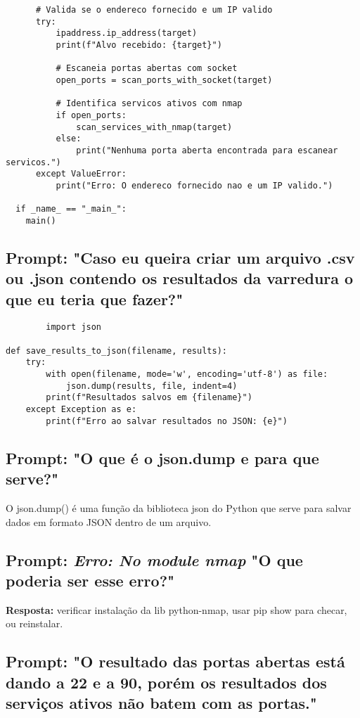 \documentclass[12pt]{article}
\begin{document}
\begin{lstlisting}
      # Valida se o endereco fornecido e um IP valido
      try:
          ipaddress.ip_address(target)
          print(f"Alvo recebido: {target}")

          # Escaneia portas abertas com socket
          open_ports = scan_ports_with_socket(target)

          # Identifica servicos ativos com nmap
          if open_ports:
              scan_services_with_nmap(target)
          else:
              print("Nenhuma porta aberta encontrada para escanear servicos.")
      except ValueError:
          print("Erro: O endereco fornecido nao e um IP valido.")

  if _name_ == "_main_":
    main()
    \end{lstlisting}

\subsection{\textbf{Prompt:} "Caso eu queira criar um arquivo .csv ou .json contendo os resultados da varredura o que eu teria que fazer?"}
    \begin{lstlisting}
        import json

def save_results_to_json(filename, results):
    try:
        with open(filename, mode='w', encoding='utf-8') as file:
            json.dump(results, file, indent=4)
        print(f"Resultados salvos em {filename}")
    except Exception as e:
        print(f"Erro ao salvar resultados no JSON: {e}")

    \end{lstlisting}
\subsection{\textbf{Prompt:} "O que é o json.dump e para que serve?"}
    O json.dump() é uma função da biblioteca json do Python que serve para salvar dados em formato JSON dentro de um arquivo.

\subsection{\textbf{Prompt:} \textit{Erro: No module nmap} "O que poderia ser esse erro?"}

\textbf{Resposta:} verificar instalação da lib python-nmap, usar pip show para checar, ou reinstalar.

\subsection{\textbf{Prompt:} "O resultado das portas abertas está dando a 22 e a 90, porém os resultados dos serviços ativos não batem com as portas."}
\end{document}
